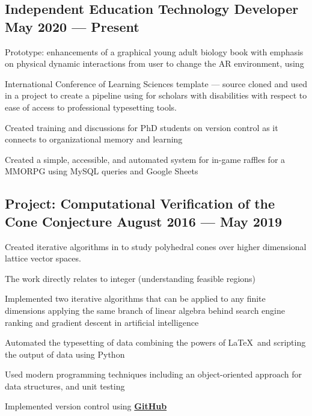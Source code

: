 \documentclass[letter,10pt]{article}
\begin{document}
\subsection{{Independent Education Technology Developer \hfill May 2020 --- Present}}
\begin{zitemize}
\item Prototype:  enhancements of a graphical young adult biology book with emphasis on physical dynamic interactions from user to change the AR environment, using 
\item International Conference of Learning Sciences \skills{\LaTeX} template --- source cloned and used in a project to create a pipeline using  for scholars with disabilities with respect to ease of access to professional typesetting tools.
\item Created training and discussions for PhD students on version control as it connects to organizational memory and learning
\item Created a simple, accessible, and automated system for in-game raffles for a MMORPG using MySQL queries and Google Sheets
\end{zitemize}


\subsection{Project: Computational Verification of the Cone Conjecture \hfill	August 2016 — May 2019}
\begin{zitemize}
\item Created iterative algorithms in  to study polyhedral cones over higher dimensional lattice vector spaces. \item The work directly relates to integer  (understanding feasible regions)
\item Implemented two iterative algorithms that can be applied to any finite dimensions applying the same branch of linear algebra behind search engine ranking and gradient descent in artificial intelligence
\item Automated the typesetting of data combining the powers of \LaTeX\, and scripting the output of data using Python
\item Used modern programming techniques including an object-oriented approach for data structures, and unit testing
\item Implemented version control using \href{https://github.com/TimmyChan/ConeThesis}{\bfseries{GitHub}} \end{zitemize}
\end{document}
